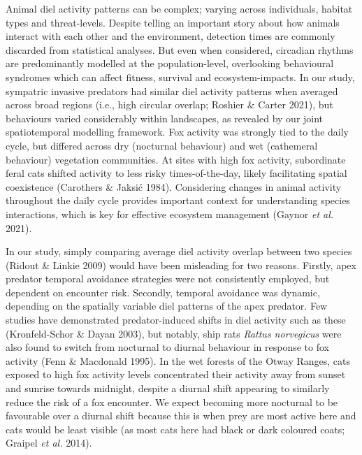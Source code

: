 \documentclass[11pt,a4paper,titlepage,twoside,openright]{style/unimelbthesis}
\begin{document}
\begin{mainmatter}
Animal diel activity patterns can be complex; varying across individuals, habitat types and threat-levels. Despite telling an important story about how animals interact with each other and the environment, detection times are commonly discarded from statistical analyses. But even when considered, circadian rhythms are predominantly modelled at the population-level, overlooking behavioural syndromes which can affect fitness, survival and ecosystem-impacts. In our study, sympatric invasive predators had similar diel activity patterns when averaged across broad regions (i.e., high circular overlap; Roshier \& Carter 2021), but behaviours varied considerably within landscapes, as revealed by our joint spatiotemporal modelling framework. Fox activity was strongly tied to the daily cycle, but differed across dry (nocturnal behaviour) and wet (cathemeral behaviour) vegetation communities. At sites with high fox activity, subordinate feral cats shifted activity to less risky times-of-the-day, likely facilitating spatial coexistence (Carothers \& Jaksić 1984). Considering changes in animal activity throughout the daily cycle provides important context for understanding species interactions, which is key for effective ecosystem management (Gaynor \emph{et al.} 2021).

In our study, simply comparing average diel activity overlap between two species (Ridout \& Linkie 2009) would have been misleading for two reasons. Firstly, apex predator temporal avoidance strategies were not consistently employed, but dependent on encounter risk. Secondly, temporal avoidance was dynamic, depending on the spatially variable diel patterns of the apex predator. Few studies have demonstrated predator-induced shifts in diel activity such as these (Kronfeld-Schor \& Dayan 2003), but notably, ship rats \emph{Rattus norvegicus} were also found to switch from nocturnal to diurnal behaviour in response to fox activity (Fenn \& Macdonald 1995). In the wet forests of the Otway Ranges, cats exposed to high fox activity levels concentrated their activity away from sunset and sunrise towards midnight, despite a diurnal shift appearing to similarly reduce the risk of a fox encounter. We expect becoming more nocturnal to be favourable over a diurnal shift because this is when prey are most active here and cats would be least visible (as most cats here had black or dark coloured coats; Graipel \emph{et al.} 2014).


\end{mainmatter}
\end{document}
